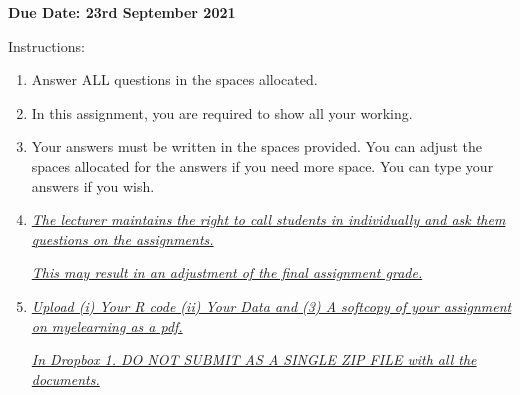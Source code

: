 \documentclass{article}
\begin{document}
	
	\textbf{Due Date: 23rd September 2021}
	
	Instructions:
	
	\begin{enumerate}
		\item Answer ALL questions in the spaces allocated.
		\item In this assignment, you are required to show all your working. 
		\item Your answers must be written in the spaces provided. You can adjust the spaces allocated for the answers if you need more space. You can type your answers if you wish. 
		\item \emph{\underline{The lecturer maintains the right to call students in individually and ask them questions on the assignments.}} 
		
		\emph{\underline{This may result in an adjustment of the final assignment grade.}}
		
		\item \emph{\underline{Upload  (i) Your R code (ii) Your Data and (3) A softcopy of your assignment on myelearning as a pdf. }} 
		
		\emph{\underline{In Dropbox 1. DO NOT SUBMIT AS A SINGLE ZIP FILE with all the documents.}}
	\end{enumerate}
	
	\vspace{2cm}
	
\end{document}
